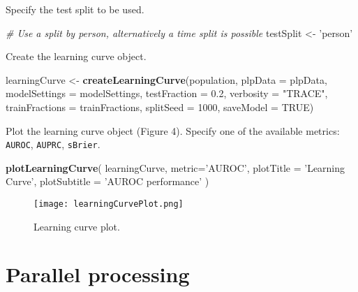 \documentclass[]{article}
\newenvironment{Shaded}{\begin{snugshade}}{\end{snugshade}}
\newcommand{\KeywordTok}[1]{\textcolor[rgb]{0.13,0.29,0.53}{\textbf{#1}}}
\newcommand{\DataTypeTok}[1]{\textcolor[rgb]{0.13,0.29,0.53}{#1}}
\newcommand{\DecValTok}[1]{\textcolor[rgb]{0.00,0.00,0.81}{#1}}
\newcommand{\FloatTok}[1]{\textcolor[rgb]{0.00,0.00,0.81}{#1}}
\newcommand{\StringTok}[1]{\textcolor[rgb]{0.31,0.60,0.02}{#1}}
\newcommand{\CommentTok}[1]{\textcolor[rgb]{0.56,0.35,0.01}{\textit{#1}}}
\newcommand{\OtherTok}[1]{\textcolor[rgb]{0.56,0.35,0.01}{#1}}
\newcommand{\NormalTok}[1]{#1}
\begin{document}
Specify the test split to be used.

\begin{Shaded}
\begin{Highlighting}[]
\CommentTok{# Use a split by person, alternatively a time split is possible}
\NormalTok{testSplit <-}\StringTok{ 'person'}
\end{Highlighting}
\end{Shaded}

Create the learning curve object.

\begin{Shaded}
\begin{Highlighting}[]
\NormalTok{learningCurve <-}\StringTok{ }\KeywordTok{createLearningCurve}\NormalTok{(population,}
                                     \DataTypeTok{plpData =}\NormalTok{ plpData,}
                                     \DataTypeTok{modelSettings =}\NormalTok{ modelSettings,}
                                     \DataTypeTok{testFraction =} \FloatTok{0.2}\NormalTok{,}
                                     \DataTypeTok{verbosity =} \StringTok{"TRACE"}\NormalTok{,}
                                     \DataTypeTok{trainFractions =}\NormalTok{ trainFractions,}
                                     \DataTypeTok{splitSeed =} \DecValTok{1000}\NormalTok{,}
                                     \DataTypeTok{saveModel =} \OtherTok{TRUE}\NormalTok{)}
\end{Highlighting}
\end{Shaded}

Plot the learning curve object (Figure 4). Specify one of the available
metrics: \texttt{AUROC}, \texttt{AUPRC}, \texttt{sBrier}.

\begin{Shaded}
\begin{Highlighting}[]
\KeywordTok{plotLearningCurve}\NormalTok{(}
\NormalTok{  learningCurve,}
  \DataTypeTok{metric=}\StringTok{'AUROC'}\NormalTok{,}
  \DataTypeTok{plotTitle =} \StringTok{'Learning Curve'}\NormalTok{,}
  \DataTypeTok{plotSubtitle =} \StringTok{'AUROC performance'}
\NormalTok{)}
\end{Highlighting}
\end{Shaded}

\begin{figure}
\centering
\texttt{[image: learningCurvePlot.png]}
\caption{Learning curve plot.}
\end{figure}

\section{Parallel processing}\label{parallel-processing}
\end{document}
